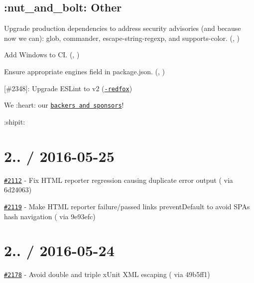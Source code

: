 \subsection*{\+:nut\+\_\+and\+\_\+bolt\+: Other}


\begin{DoxyItemize}
\item Upgrade production dependencies to address security advisories (and because now we can)\+: {\ttfamily glob}, {\ttfamily commander}, {\ttfamily escape-\/string-\/regexp}, and {\ttfamily supports-\/color}. (\href{https://github.com/boneskull}{\tt }, \href{https://github.com/robloach}{\tt })
\item Add Windows to CI. (\href{https://github.com/boneskull}{\tt }, \href{https://github.com/timothygu}{\tt })
\item Ensure appropriate {\ttfamily engines} field in {\ttfamily package.\+json}. (\href{https://github.com/shinnn}{\tt }, \href{https://github.com/boneskull}{\tt })
\item \mbox{[}\#2348\mbox{]}\+: Upgrade E\+S\+Lint to v2 (\href{https://github.com/anthony-redfox}{\tt -\/redfox})
\end{DoxyItemize}

We \+:heart\+: our \href{https://opencollective.com/mochajs}{\tt backers and sponsors}!

\+:shipit\+:

\section*{2.. / 2016-\/05-\/25}


\begin{DoxyItemize}
\item \href{https://github.com/mochajs/mocha/pull/2112}{\tt \#2112} -\/ Fix H\+T\+ML reporter regression causing duplicate error output (\href{https://github.com/danielstjules}{\tt } via 6d24063)
\item \href{https://github.com/mochajs/mocha/pull/2119}{\tt \#2119} -\/ Make H\+T\+ML reporter failure/passed links prevent\+Default to avoid S\+PA\textquotesingle{}s hash navigation (\href{https://github.com/jimenglish81}{\tt } via 9e93efc)
\end{DoxyItemize}

\section*{2.. / 2016-\/05-\/24}


\begin{DoxyItemize}
\item \href{https://github.com/mochajs/mocha/pull/2178}{\tt \#2178} -\/ Avoid double and triple x\+Unit X\+ML escaping (\href{https://github.com/graingert}{\tt } via 49b5ff1)
\end{DoxyItemize}

